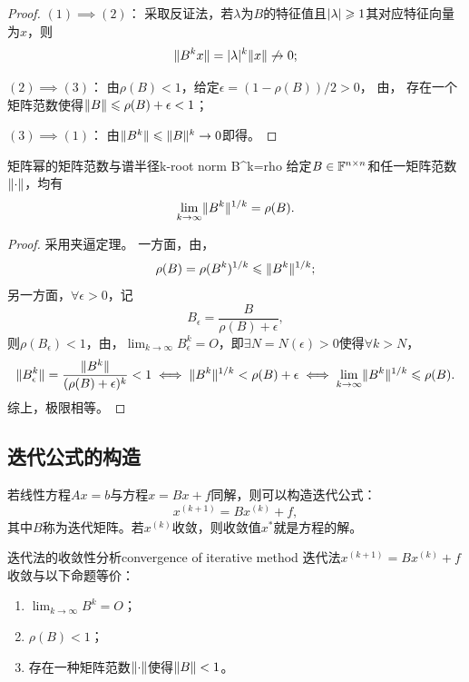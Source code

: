\begin{proof}
    $(1) \implies (2)$：
    采取反证法，若$\lambda$为$B$的特征值且$\lvert\lambda\rvert \geqslant 1$其对应特征向量为$x$，则
    \[
        \lVert B^kx\rVert = \lvert\lambda\rvert^k\lVert x\rVert\not \to 0;
    \]

    $(2) \implies (3)$：
    由$\rho(B) < 1$，给定$\epsilon = (1 - \rho(B))/2 > 0$，
    由，
    存在一个矩阵范数使得$\lVert B\rVert \leqslant \rho(B) + \epsilon < 1$；

    $(3) \implies (1)$：
    由$\lVert B^k\rVert \leqslant \lVert B\rVert^k \to 0$即得。
\end{proof}

\begin{theorem}
    {矩阵幂的矩阵范数与谱半径}{k-root norm B^k=rho}
    给定$B \in \mathbb{F}^{n\times n}$和任一矩阵范数$\lVert\cdot\rVert$，均有
    \begin{equation}
        \lim_{k\to\infty}\lVert B^k\rVert^{1/k} = \rho(B).
    \end{equation}
\end{theorem}

\begin{proof}
    采用夹逼定理。
    一方面，由，
    \[
        \rho(B) = \rho(B^k)^{1/k} \leqslant \lVert B^k\rVert^{1/k};
    \]
    另一方面，$\forall\epsilon > 0$，记
    \[
        B_\epsilon = \frac{B}{\rho(B) + \epsilon},
    \]
    则$\rho(B_\epsilon) < 1$，由，$\textstyle \lim_{k\to\infty}B_\epsilon^k = O$，即$\exists N = N(\epsilon) > 0$使得$\forall k > N$，
    \[
        \lVert B_\epsilon^k\rVert = \frac{\lVert B^k\rVert}{(\rho(B) + \epsilon)^k} < 1 \iff \lVert B^k\rVert^{1/k} < \rho(B) + \epsilon \iff \lim_{k\to\infty}\lVert B^k\rVert^{1/k} \leqslant \rho(B).
    \]
    综上，极限相等。
\end{proof}

\subsection{迭代公式的构造}

若线性方程$Ax = b$与方程$x = Bx + f$同解，则可以构造迭代公式：
\begin{equation}
    x^{(k+1)} = Bx^{(k)} + f,
\end{equation}
其中$B$称为迭代矩阵。若$x^{(k)}$收敛，则收敛值$x^*$就是方程的解。

\begin{theorem}
    {迭代法的收敛性分析}{convergence of iterative method}
    迭代法$x^{(k+1)} = Bx^{(k)} + f$收敛与以下命题等价：
    \begin{enumerate}
        \item $\textstyle \lim_{k\to\infty}B^k = O$；
        \item $\rho(B) < 1$；
        \item 存在一种矩阵范数$\lVert\cdot\rVert$使得$\lVert B\rVert < 1$。
    \end{enumerate}
\end{theorem}


